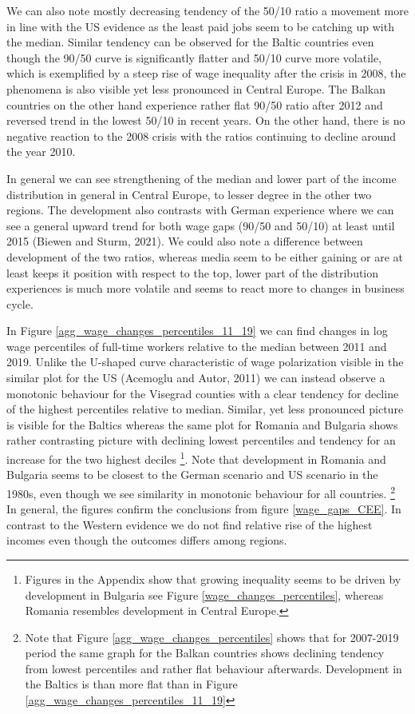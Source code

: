 \documentclass{article}
\begin{document}
We can also note mostly decreasing tendency of the 50/10 ratio a movement more in line with the US evidence as the least paid jobs seem to be catching up with the median. Similar tendency can be observed for the Baltic countries even though the 90/50 curve is significantly flatter and 50/10 curve more volatile, which is exemplified by a steep rise of wage inequality after the crisis in 2008, the phenomena is also visible yet less pronounced in Central Europe. The Balkan countries on the other hand experience rather flat 90/50 ratio after 2012 and reversed trend in the lowest 50/10 in recent years. On the other hand, there is no negative reaction to the 2008 crisis with the ratios continuing to decline around the year 2010.

In general we can see strengthening of the median and lower part of the income distribution in general in Central Europe, to lesser degree in the other two regions. The development also contrasts with German experience where we can see a general upward trend for both wage gaps (90/50 and 50/10) at least until 2015 (Biewen and Sturm, 2021). We could also note a difference between development of the two ratios, whereas media seem to be either gaining or are at least keeps it position with respect to the top, lower part of the distribution experiences is much more volatile and seems to react more to changes in business cycle.


In Figure \ref{agg_wage_changes_percentiles_11_19} we can find changes in log wage percentiles of full-time workers relative to the median between 2011 and 2019. Unlike the U-shaped curve characteristic of wage polarization visible in the similar plot for the US (Acemoglu and Autor, 2011) we can instead observe a monotonic behaviour for the Visegrad counties with a clear tendency for decline of the highest percentiles relative to median. Similar, yet less pronounced picture is visible for the Baltics whereas the same plot for Romania and Bulgaria shows rather contrasting picture with declining lowest percentiles and tendency for an increase for the two highest deciles \footnote{Figures in the Appendix show that growing inequality seems to be driven by development in Bulgaria see Figure \ref{wage_changes_percentiles}, whereas Romania resembles development in Central Europe.}. Note that development in Romania and Bulgaria seems to be closest to the German scenario and US scenario in the 1980s, even though we see similarity in monotonic behaviour for all countries. 
\footnote{Note that Figure \ref{agg_wage_changes_percentiles} shows that for 2007-2019 period the same graph for the Balkan countries shows declining tendency from lowest percentiles and rather flat behaviour afterwards. Development in the Baltics is than more flat than in Figure \ref{agg_wage_changes_percentiles_11_19}} In general, the figures confirm the conclusions from figure \ref{wage_gaps_CEE}. In contrast to the Western evidence we do not find relative rise of the highest incomes even though the outcomes differs among regions.\\
\end{document}

